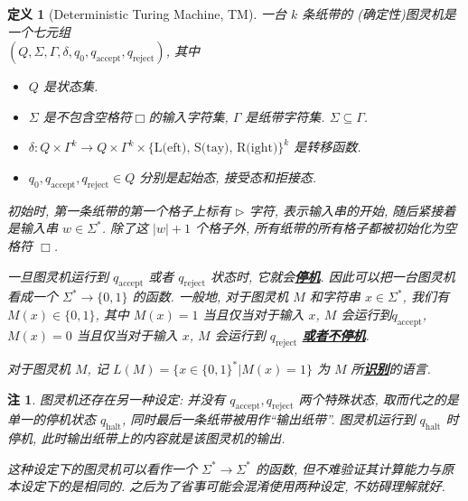 \documentclass[8pt]{article}
\theoremstyle{compact}
\newtheorem{definition}[theorem]{定义}
\newtheorem{remark}[theorem]{注}
\def\obj#1{\textbf{\uline{#1}}}
\def\num#1{\textnormal{\textbf{\mbox{\textcolor{blue}{(#1)}}}}}
\begin{document}
\begin{definition}[Deterministic Turing Machine, TM]
	一台 $k$ 条纸带的 (确定性)图灵机是一个七元组 \\ $(Q, \Sigma, \Gamma, \delta, q_0, q_{\text{accept}}, q_{\text{reject}})$, 其中
	\begin{itemize}
		\item $Q$ 是状态集.
		\item $\Sigma$ 是不包含空格符$\Box$的输入字符集, $\Gamma$ 是纸带字符集. $\Sigma \subseteq \Gamma$.
		\item $\delta: Q \times \Gamma^k \to Q \times \Gamma^k \times \{\text{L(eft), S(tay), R(ight)}\}^k$ 是转移函数.
		\item $q_0, q_{\text{accept}}, q_{\text{reject}} \in Q$ 分别是起始态, 接受态和拒接态.
	\end{itemize}

	初始时, 第一条纸带的第一个格子上标有 $\triangleright$ 字符, 表示输入串的开始, 随后紧接着是输入串 $w \in \Sigma^*$. 除了这 $|w| + 1$ 个格子外, 所有纸带的所有格子都被初始化为空格符 $\Box$.

	一旦图灵机运行到 $q_{\text{accept}}$ 或者 $q_{\text{reject}}$ 状态时, 它就会\obj{停机}. 因此可以把一台图灵机看成一个 $\Sigma^* \to \{0, 1\}$ 的函数. 一般地, 对于图灵机 $M$ 和字符串 $x \in \Sigma^*$, 我们有 $M(x) \in \{0, 1\}$, 其中 $M(x) = 1$ 当且仅当对于输入 $x$, $M$ 会运行到$q_{\text{accept}}$, $M(x) = 0$ 当且仅当对于输入 $x$, $M$ 会运行到 $q_{\text{reject}}$ \obj{或者不停机}.

	对于图灵机 $M$, 记 $L(M) = \{x \in \{0, 1\}^* | M(x) = 1\}$ 为 $M$ 所\obj{识别}的语言.
\end{definition}
\begin{remark}
	图灵机还存在另一种设定: 并没有 $q_{\text{accept}}, q_{\text{reject}}$ 两个特殊状态, 取而代之的是单一的停机状态 $q_{\text{halt}}$, 同时最后一条纸带被用作“输出纸带”. 图灵机运行到 $q_{\text{halt}}$ 时停机, 此时输出纸带上的内容就是该图灵机的输出. 

	这种设定下的图灵机可以看作一个 $\Sigma^* \to \Sigma^*$ 的函数, 但不难验证其计算能力与原本设定下的是相同的. 之后为了省事可能会混淆使用两种设定, 不妨碍理解就好.
\end{remark}
\end{document}
